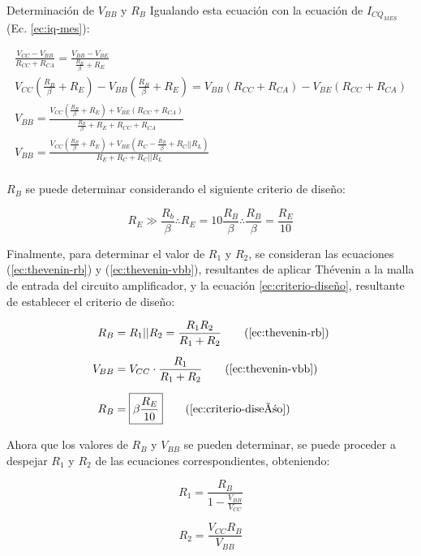 \begin{frame}[allowframebreaks]{Determinación de $V_{BB}$ y $R_B$}
Igualando esta ecuación con la ecuación de $I_{CQ_{MES}}$ (Ec. \ref{ec:iq-mes}):

\begin{gather*}
    \frac{V_{CC}-V_{BB}}{R_{CC} + R_{CA}}= \frac{V_{BB}-V_{BE}}{\frac{R_B}{\beta}+R_E} \nonumber\\[6pt]
    V_{CC}(\frac{R_B}{\beta}+R_E) - V_{BB}(\frac{R_B}{\beta}+R_E) = V_{BB}(R_{CC}+R_{CA}) - V_{BE}(R_{CC}+R_{CA}) \nonumber\\[6pt]
    V_{BB} = \frac{V_{CC}(\frac{R_B}{\beta}+R_E) + V_{BE}(R_{CC}+R_{CA})}{\frac{R_B}{\beta}+R_E + R_{CC} + R_{CA}} \nonumber\\[6pt]
    V_{BB} = \frac{V_{CC}(\frac{R_B}{\beta}+R_E) + V_{BE}(R_C-\frac{R_B}{\beta}+R_C||R_L)}{R_E + R_C + R_C||R_L}\\[6pt]
\end{gather*}

$R_B$ se puede determinar considerando el siguiente criterio de diseño:

\begin{equation}
    R_E  \gg \frac{R_b}{\beta} \therefore R_E = 10\frac{R_B}{\beta} \therefore \frac{R_B}{\beta} = \frac{R_E}{10} \label{ec:criterio-diseño}
\end{equation}

Finalmente, para determinar el valor de $R_1$ y $R_2$, se consideran las ecuaciones (\ref{ec:thevenin-rb}) y (\ref{ec:thevenin-vbb}), resultantes de aplicar Thévenin a la malla de entrada del circuito 
amplificador, y la ecuación \ref{ec:criterio-diseño},
resultante de establecer el criterio de diseño:

\begin{align*}
    R_B &= R_1||R_2=\frac{R_1 R_2}{R_1 + R_2} \tag{\ref{ec:thevenin-rb}}\\[6pt]
    V_{BB} &= V_{CC} \cdot \frac{R_1}{R_1 + R_2} \tag{\ref{ec:thevenin-vbb}}\\[6pt]
    R_B &= \boxed{\beta \frac{R_E}{10}} \tag{\ref{ec:criterio-diseño}}
\end{align*}

Ahora que los valores de $R_B$ y $V_{BB}$ se pueden determinar, se puede proceder a 
despejar $R_1$ y  $R_2$ de las ecuaciones correspondientes, obteniendo:

\begin{center}
    \begin{minipage}{0.3\textwidth}
    \begin{equation*}
        \boxed{R_1 = \frac{R_B}{1-\frac{V_{BB}}{V_{CC}}}}
    \end{equation*}
    \end{minipage}
    \begin{minipage}{0.3\textwidth}
    \begin{equation*}
        \boxed{R_2 = \frac{V_{CC}R_B}{V_{BB}}}
    \end{equation*}
    \end{minipage}
\end{center}
\end{frame}

